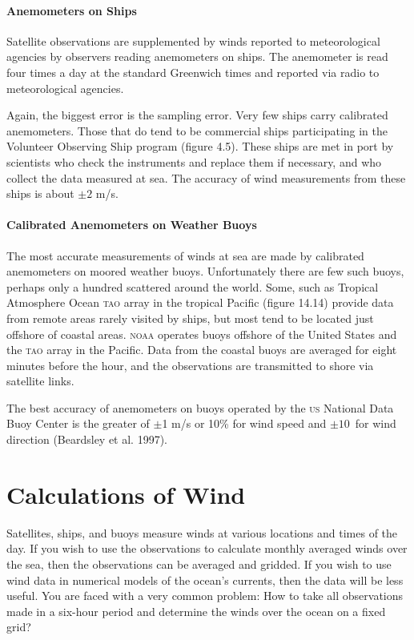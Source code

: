 \paragraph{Anemometers on Ships}
Satellite observations are supplemented by winds reported to
meteorological agencies by observers reading ane\-mom\-eters on
ships. The anemometer is read four times a day at the standard
Greenwich times and reported via radio to meteorological agencies.

Again, the biggest error is the sampling error. Very few ships carry calibrated anemometers. Those that do
tend to be commercial ships participating in the Volunteer Observing
Ship program (figure 4.5). These ships are met in port by scientists
who check the instruments and replace them if necessary, and who
collect the data measured at sea.  The
accuracy of wind measurements from these
ships is about $\pm 2$ m/s.

\paragraph{Calibrated Anemometers on Weather Buoys}
The most accurate measurements of winds at sea are made by calibrated
anemometers on moored weather buoys. Unfortunately there are few such
buoys, perhaps only a hundred scattered around the world. Some, such
as Tropical Atmosphere Ocean \textsc{tao} array in the tropical
Pacific (figure 14.14) provide data from remote areas rarely visited
by ships, but most tend to be located just offshore of coastal areas.
\textsc{noaa} operates buoys offshore of the United States and the
\textsc{tao} array in the Pacific. Data from the coastal buoys are
averaged for eight minutes before the hour, and the observations are
transmitted to shore via satellite links.

The best accuracy of anemometers on buoys operated by the \textsc{us}
National Data Buoy Center is the greater of \(\pm\)1 m/s or 10\% for
wind speed and $\pm 10$\degrees\ for wind direction (Beardsley et
al. 1997).

\section{Calculations of Wind}
Satellites, ships,
and buoys measure winds at various locations and times of the day. If
you wish to use the observations to calculate monthly averaged winds
over the sea, then the observations can be averaged and gridded. If
you wish to use wind data in numerical models of the ocean's currents,
then the data will be less useful. You are faced with a very common
problem: How to take all observations made in a six-hour period and
determine the winds over the ocean on a fixed grid?

